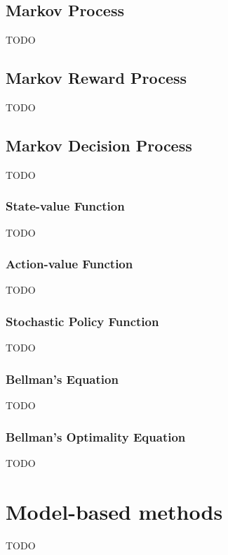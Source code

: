 \documentclass[../chapters.tex]{subfiles}
\begin{document}
    \subsection{Markov Process}\label{subsec:markov-process}
    TODO

    \subsection{Markov Reward Process}\label{subsec:markov-reward-process}
    TODO

    \subsection{Markov Decision Process}\label{subsec:markov-decision-process}
    TODO

    \subsubsection{State-value Function}\label{subsubsec:state-value-function}
    TODO

    \subsubsection{Action-value Function}\label{subsubsec:action-value-function}
    TODO

    \subsubsection{Stochastic Policy Function}\label{subsubsec:stochastic-policy-function}
    TODO

    \subsubsection{Bellman's Equation}\label{subsec:bellman-equation}
    TODO

    \subsubsection{Bellman's Optimality Equation}\label{subsec:bellman-optimality-equation}
    TODO


    \section{Model-based methods}
    TODO

\end{document}
